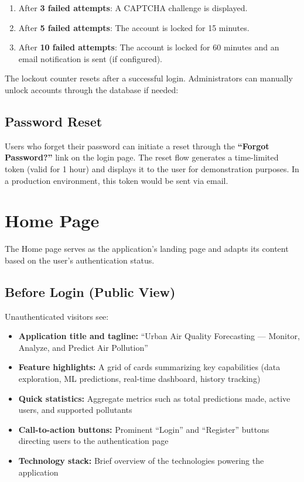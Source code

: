 \begin{enumerate}
    \item After \textbf{3 failed attempts}: A CAPTCHA challenge is displayed.
    \item After \textbf{5 failed attempts}: The account is locked for 15 minutes.
    \item After \textbf{10 failed attempts}: The account is locked for 60 minutes and an email notification is sent (if configured).
\end{enumerate}

\noindent The lockout counter resets after a successful login. Administrators can manually unlock accounts through the database if needed:


\subsection{Password Reset}

Users who forget their password can initiate a reset through the \textbf{``Forgot Password?''} link on the login page. The reset flow generates a time-limited token (valid for 1 hour) and displays it to the user for demonstration purposes. In a production environment, this token would be sent via email.

\section{Home Page}
\label{sec:user-home}

The Home page serves as the application's landing page and adapts its content based on the user's authentication status.

\subsection{Before Login (Public View)}

Unauthenticated visitors see:

\begin{itemize}
    \item \textbf{Application title and tagline:} ``Urban Air Quality Forecasting --- Monitor, Analyze, and Predict Air Pollution''
    \item \textbf{Feature highlights:} A grid of cards summarizing key capabilities (data exploration, ML predictions, real-time dashboard, history tracking)
    \item \textbf{Quick statistics:} Aggregate metrics such as total predictions made, active users, and supported pollutants
    \item \textbf{Call-to-action buttons:} Prominent ``Login'' and ``Register'' buttons directing users to the authentication page
    \item \textbf{Technology stack:} Brief overview of the technologies powering the application
\end{itemize}

